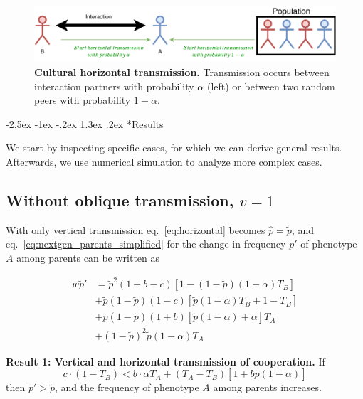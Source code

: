 \documentclass[12pt]{extarticle}
\makeatletter
\renewcommand\section{\@startsection {section}{1}{\z@}%
     {-2.5ex \@plus -1ex \@minus -.2ex}%
     {1.3ex \@plus.2ex}%
    {\Large\bfseries}}
\makeatother
\begin{document}
\begin{figure}[b]
  \centering
  \includegraphics[scale=1]{figure.pdf}
  \caption{\textbf{Cultural horizontal transmission.} Transmission occurs between interaction partners with probability $\alpha$ (left) or between two random peers with probability $1-\alpha$.}
  \label{fig:horizontal}
\end{figure}

\section*{Results}

We start by inspecting specific cases, for which we can derive general results. 
Afterwards, we use numerical simulation to analyze more complex cases.

\subsection*{Without oblique transmission, $v=1$}

With only vertical transmission eq.~\ref{eq:horizontal} becomes
$\hat{p} =  \tilde{p}$,
and eq.~\ref{eq:nextgen_parents_simplified} for the change in frequency $p'$ of phenotype $A$ among parents can be written as

\begin{equation} 
\begin{split}\label{eq:nextgen_parents_vertical_only}
\bar{w} \tilde{p}' 
& = \tilde{p}^2 (1+b-c) [1 - (1-\tilde{p}) (1-\alpha) T_B] \\
& + \tilde{p}(1-\tilde{p}) (1-c) [\tilde{p} (1-\alpha) T_B + 1 - T_B] \\
& + \tilde{p}(1-\tilde{p}) (1+b) [\tilde{p} (1-\alpha) + \alpha] T_A \\
& + (1-\tilde{p})^2 \tilde{p} (1-\alpha) T_A
\end{split}
\end{equation}

\textbf{Result 1: Vertical and horizontal transmission of cooperation.}
If 
\begin{equation} \label{eq:unequal_transmission}
c \cdot (1-T_B) < b \cdot  \alpha T_A  + (T_A - T_B) [1 + b\tilde{p}(1-\alpha)]
\end{equation}
then $\tilde{p}' > \tilde{p}$, and the frequency of phenotype $A$ among parents increases. 
\end{document}
